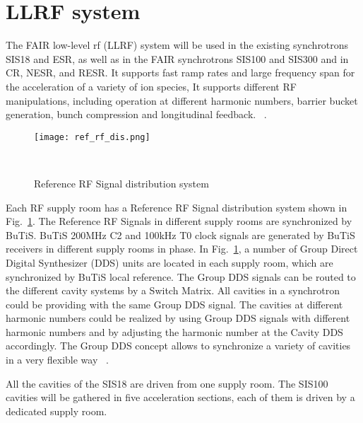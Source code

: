 \section{LLRF system}
\label{sec:LLRF}
The FAIR low-level rf (\gls{LLRF}) system will be used in the existing synchrotrons SIS18 and \gls{ESR}, as well as in the FAIR synchrotrons SIS100 and SIS300 and in \gls{CR}, \gls{NESR}, and \gls{RESR}. It supports fast ramp rates and large frequency span for the acceleration of a variety of ion species, It supports different RF manipulations, including operation at different harmonic numbers, barrier bucket generation, bunch compression and longitudinal feedback. ~\cite{klingbeil_new_2011}. 

\begin{figure}[!htb]
   \centering   
   \texttt{[image: ref\_rf\_dis.png]}
   \caption{Reference RF Signal distribution system}{~\cite{klingbeil_new_2011}}
   \label{ref_rf_dis}
\end{figure}
Each RF supply room has a Reference RF Signal distribution system shown in Fig.~\ref{ref_rf_dis}. The Reference RF Signals in different supply rooms are synchronized by BuTiS. BuTiS 200MHz C2 and 100kHz T0 clock signals are generated by BuTiS receivers in different supply rooms in phase. In Fig.~\ref{ref_rf_dis}, a number of Group Direct Digital Synthesizer (DDS) units are located in each supply room, which are synchronized by BuTiS local reference. The Group DDS signals can be routed to the different cavity systems by a Switch Matrix. All cavities in a synchrotron could be providing with the same Group DDS signal. The cavities at different harmonic numbers could be realized by using Group DDS signals with different harmonic numbers and by adjusting the harmonic number at the Cavity DDS accordingly. The Group DDS concept allows to synchronize a variety of cavities in a very flexible way ~\cite{klingbeil_new_2011}. 

All the cavities of the SIS18 are driven from one supply room. The SIS100 cavities will be gathered in five acceleration sections, each of them is driven by a dedicated supply room. 

